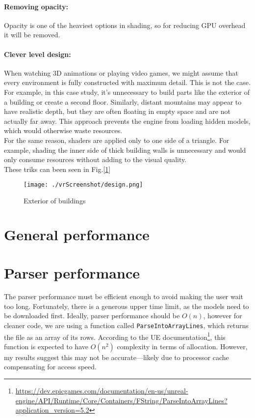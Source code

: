 \paragraph{Removing opacity:}
Opacity is one of the heaviest options in shading, so for reducing GPU overhead it will be removed.

\paragraph{Clever level design:}
When watching 3D animations or playing video games, we might assume that every environment is fully constructed with maximum detail.
This is not the case. For example, in this case study, it's unnecessary to build parts like the exterior of a building or create a second floor.
Similarly, distant mountains may appear to have realistic depth, but they are often floating in empty space and are not actually far away.
This approach prevents the engine from loading hidden models, which would otherwise waste resources.\\
For the same reason, shaders are applied only to one side of a triangle.
For example, shading the inner side of thick building walls is unnecessary and would only consume resources without adding to the visual quality.\\
These triks can been seen in Fig.[\ref{fig:design}]



\begin{figure}[ht]
  \texttt{[image: ./vrScreenshot/design.png]}
  \caption{Exterior of buildings}
  \label{fig:design}
\end{figure}

\section{General performance}


\section{Parser performance}\noindent
The parser performance must be efficient enough to avoid making the user wait too long. Fortunately, there is a generous upper time limit, as the models need to be downloaded first.
Ideally, parser performance should be $O(n)$, however for cleaner code, we are using a function called \texttt{ParseIntoArrayLines}, which returns the file as an array of its rows.
According to the \ac{UE} documentation\footnote{\url{https://dev.epicgames.com/documentation/en-us/unreal-engine/API/Runtime/Core/Containers/FString/ParseIntoArrayLines?application_version=5.2}}, this function is expected to have $O(n^2)$ complexity in terms of allocation.
However, my results suggest this may not be accurate—likely due to processor cache compensating for access speed.

